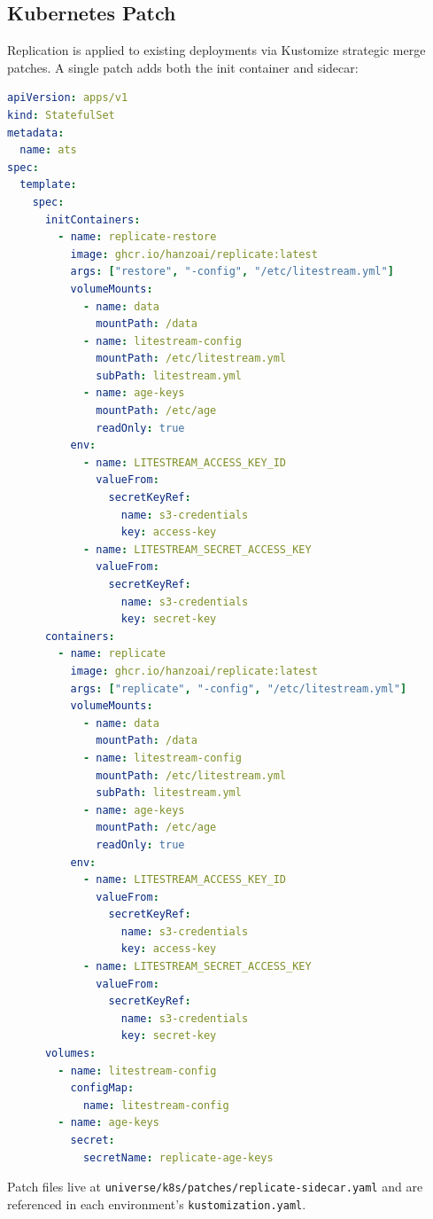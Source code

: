 \subsection{Kubernetes Patch}\label{sec:k8s-patch}

Replication is applied to existing deployments via Kustomize strategic
merge patches. A single patch adds both the init container and sidecar:

\begin{lstlisting}[language=YAML,caption={Kustomize patch: replicate-sidecar.yaml}]
apiVersion: apps/v1
kind: StatefulSet
metadata:
  name: ats
spec:
  template:
    spec:
      initContainers:
        - name: replicate-restore
          image: ghcr.io/hanzoai/replicate:latest
          args: ["restore", "-config", "/etc/litestream.yml"]
          volumeMounts:
            - name: data
              mountPath: /data
            - name: litestream-config
              mountPath: /etc/litestream.yml
              subPath: litestream.yml
            - name: age-keys
              mountPath: /etc/age
              readOnly: true
          env:
            - name: LITESTREAM_ACCESS_KEY_ID
              valueFrom:
                secretKeyRef:
                  name: s3-credentials
                  key: access-key
            - name: LITESTREAM_SECRET_ACCESS_KEY
              valueFrom:
                secretKeyRef:
                  name: s3-credentials
                  key: secret-key
      containers:
        - name: replicate
          image: ghcr.io/hanzoai/replicate:latest
          args: ["replicate", "-config", "/etc/litestream.yml"]
          volumeMounts:
            - name: data
              mountPath: /data
            - name: litestream-config
              mountPath: /etc/litestream.yml
              subPath: litestream.yml
            - name: age-keys
              mountPath: /etc/age
              readOnly: true
          env:
            - name: LITESTREAM_ACCESS_KEY_ID
              valueFrom:
                secretKeyRef:
                  name: s3-credentials
                  key: access-key
            - name: LITESTREAM_SECRET_ACCESS_KEY
              valueFrom:
                secretKeyRef:
                  name: s3-credentials
                  key: secret-key
      volumes:
        - name: litestream-config
          configMap:
            name: litestream-config
        - name: age-keys
          secret:
            secretName: replicate-age-keys
\end{lstlisting}

Patch files live at \texttt{universe/k8s/patches/replicate-sidecar.yaml}
and are referenced in each environment's \texttt{kustomization.yaml}.

